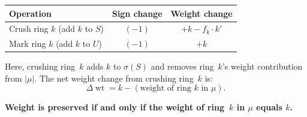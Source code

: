 \documentclass[11pt]{article}
\DeclareMathOperator{\wt}{wt}
\theoremstyle{plain}
\theoremstyle{definition}
\begin{document}
\medskip
\begin{center}
\renewcommand{\arraystretch}{1.3}
\begin{tabular}{l|c|c}
\textbf{Operation} & \textbf{Sign change} &
  \textbf{Weight change} \\ \hline
Crush ring $k$ (add $k$ to $S$) &
  $(-1)$ & $+k - f_k \cdot k'$ \\
Mark ring $k$ (add $k$ to $U$) &
  $(-1)$ & $+k$ \\
\end{tabular}
\end{center}

\medskip\noindent
Here, crushing ring~$k$ adds $k$ to $\sigma(S)$ and
removes ring~$k$'s weight contribution from $|\mu|$.
The net weight change from crushing ring~$k$ is:
\begin{equation}\label{eq:crush-weight}
  \boxed{\;
    \Delta\wt = k - (\text{weight of ring } k \text{ in } \mu).
  \;}
\end{equation}

\textbf{Weight is preserved if and only if the weight of
ring~$k$ in $\mu$ equals $k$.}
\end{document}

